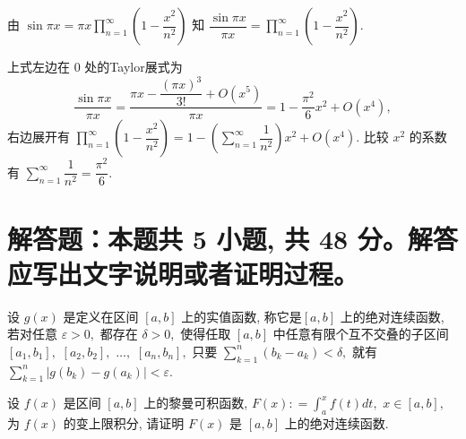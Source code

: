\begin{solution}
  由 $\sin \pi x = \pi x \prod\limits_{n=1}^{\infty} \left( 1 - \dfrac{x^2}{n^2} \right)$ 知 $\dfrac{\sin \pi x}{\pi x} = \prod\limits_{n=1}^{\infty} \left( 1 - \dfrac{x^2}{n^2} \right).$

  上式左边在 $0$ 处的Taylor展式为
  $$\dfrac{\sin \pi x}{\pi x} = \dfrac{\pi x - \dfrac{(\pi x)^3}{3!} + O(x^5)}{\pi x} = 1 - \dfrac{\pi^2}{6} x^2 + O(x^4), $$
  右边展开有 $\prod\limits_{n=1}^{\infty} \left( 1 - \dfrac{x^2}{n^2} \right) = 1 - \left( \sum\limits_{n=1}^{\infty} \dfrac{1}{n^2} \right) x^2 + O(x^4).$ 比较 $x^2$ 的系数有 $\sum\limits_{n=1}^{\infty} \dfrac{1}{n^2} = \dfrac{\pi^2}{6}.$
\end{solution}


\section{解答题：本题共 5 小题, 共 48 分。解答应写出文字说明或者证明过程。}


\begin{question}[points = 6]
  设 $g(x)$ 是定义在区间 $[a, b]$ 上的实值函数, 称它是$[a, b]$ 上的绝对连续函数, 若对任意 $\varepsilon > 0,$ 都存在 $\delta > 0,$ 使得任取 $[a, b]$ 中任意有限个互不交叠的子区间 $[a_1, b_1],$ $[a_2, b_2],$ $\dots,$ $[a_n, b_n],$ 只要 $\sum\limits_{k=1}^n (b_k - a_k) < \delta,$ 就有 $\sum\limits_{k=1}^n \lvert g(b_k) - g(a_k) \rvert < \varepsilon.$

  设 $f(x)$ 是区间 $[a, b]$ 上的黎曼可积函数, $F(x) : = \int_{a}^{x} f(t) dt,$ $x \in [a, b],$ 为 $f(x)$ 的变上限积分, 请证明 $F(x)$ 是 $[a, b]$ 上的绝对连续函数.

\end{question}

